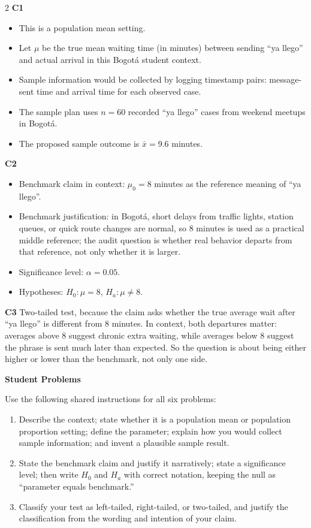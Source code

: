 \documentclass[12pt]{article}
\newcommand{\SubsectionBox}[1]{%
\noindent\colorbox{gray!30}{%
\parbox{\linewidth}{\textbf{#1}}%
}\par\vspace{0.35cm}%
}
\begin{document}
\begin{multicols}{2}
\textbf{C1}
\begin{itemize}
\item This is a population mean setting.
\item Let \(\mu\) be the true mean waiting time (in minutes) between sending ``ya llego'' and actual arrival in this Bogotá student context.
\item Sample information would be collected by logging timestamp pairs: message-sent time and arrival time for each observed case.
\item The sample plan uses \(n=60\) recorded ``ya llego'' cases from weekend meetups in Bogotá.
\item The proposed sample outcome is \(\bar{x}=9.6\) minutes.
\end{itemize}

\textbf{C2}
\begin{itemize}
\item Benchmark claim in context: \(\mu_0=8\) minutes as the reference meaning of ``ya llego''.
\item Benchmark justification: in Bogotá, short delays from traffic lights, station queues, or quick route changes are normal, so 8 minutes is used as a practical middle reference; the audit question is whether real behavior departs from that reference, not only whether it is larger.
\item Significance level: \(\alpha=0.05\).
\item Hypotheses: \(H_0\colon \mu=8\), \(H_a\colon \mu\neq 8\).
\end{itemize}

\textbf{C3}
Two-tailed test, because the claim asks whether the true average wait after ``ya llego'' is different from 8 minutes. In context, both departures matter: averages above 8 suggest chronic extra waiting, while averages below 8 suggest the phrase is sent much later than expected. So the question is about being either higher or lower than the benchmark, not only one side.

\vspace{0.25cm}
\SubsectionBox{Student Problems}\vspace{-0.25cm}

Use the following shared instructions for all six problems:
\begin{enumerate}
\item[(C1)] Describe the context; state whether it is a population mean or population proportion setting; define the parameter; explain how you would collect sample information; and invent a plausible sample result.
\item[(C2)] State the benchmark claim and justify it narratively; state a significance level; then write \(H_0\) and \(H_a\) with correct notation, keeping the null as ``parameter equals benchmark.''
\item[(C3)] Classify your test as left-tailed, right-tailed, or two-tailed, and justify the classification from the wording and intention of your claim.
\end{enumerate}


\end{multicols}
\end{document}
